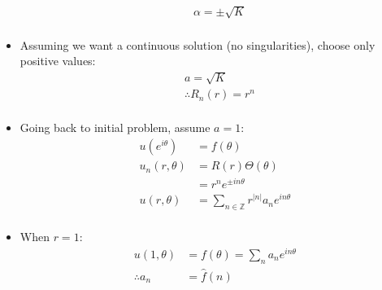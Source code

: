 \documentclass[12pt, a4paper]{article}
\begin{document}
\begin{itemize}
\begin{align*}
        &\alpha = \pm \sqrt{K} \\
    \end{align*}
    \item Assuming we want a continuous solution (no singularities), choose only positive values:
    \begin{align*}
        &a = \sqrt{K}\\
        &\therefore R_n(r) = r^n\\
    \end{align*}
    \item Going back to initial problem, assume $a=1$:
    \begin{align*}
        u(e^{i\theta}) &= f(\theta)\\
        u_n(r, \theta) &= R(r)\Theta(\theta)\\
        &=r^ne^{\pm in\theta}\\
        u(r, \theta) &= \sum_{n\in\mathbb{Z}}r^{|n|}a_ne^{in\theta}\\
    \end{align*}
    \item When $r=1$:
    \begin{align*}
        u(1, \theta) &= f(\theta) = \sum_n a_n e^{in\theta}\\
        \therefore a_n &= \hat{f}(n)\\
    \end{align*}
\end{itemize}
\end{document}
